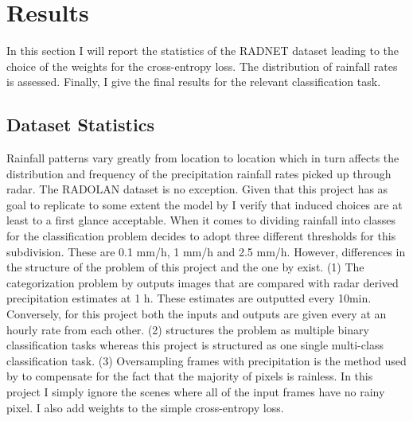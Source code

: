 \chapter{Results}\label{chap3}
\thispagestyle{plain}

In this section I will report the statistics of the RADNET dataset leading to the choice of the weights for the cross-entropy loss. The distribution of rainfall rates is assessed. Finally, I give the final results for the relevant classification task.
\section{Dataset Statistics}
Rainfall patterns vary greatly from location to location which in turn affects the distribution and frequency of the precipitation rainfall rates picked up through radar. The RADOLAN dataset is no exception. Given that this project has as goal to replicate to some extent the model by \citet{Agrawal2019MachineImages} I verify that induced choices are at least to a first glance acceptable. When it comes to dividing rainfall into classes for the classification problem \citet{Agrawal2019MachineImages} decides to adopt three different thresholds for this subdivision. These are 0.1 mm/h, 1 mm/h and 2.5 mm/h. However, differences in the structure of the problem of this project and the one by \citet{Agrawal2019MachineImages} exist. (1) The categorization problem by \citet{Agrawal2019MachineImages} outputs images that are compared with radar derived precipitation estimates at 1 h. These estimates are outputted every 10min. Conversely, for this project both the inputs and outputs are given every at an hourly rate from each other. (2) \citet{Agrawal2019MachineImages} structures the problem as multiple binary classification tasks whereas this project is structured as one single multi-class classification task. (3) Oversampling frames with precipitation is the method used by \citet{Agrawal2019MachineImages} to compensate for the fact that the majority of pixels is rainless. In this project I simply ignore the scenes where all of the input frames have no rainy pixel. I also add weights to the simple cross-entropy loss.

